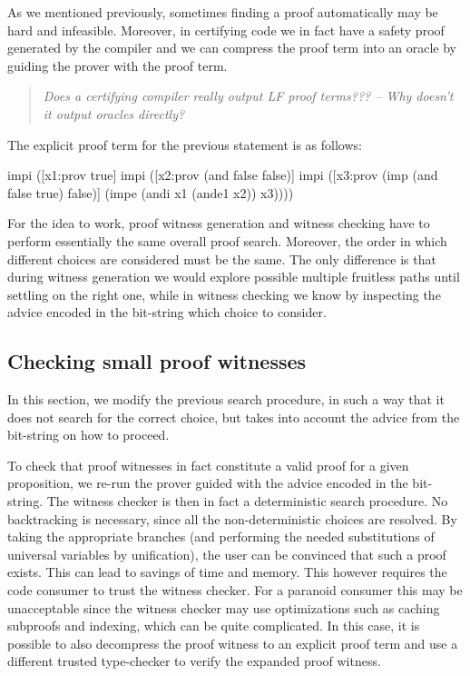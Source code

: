 \documentclass{acmconf}
\newenvironment{note}{\begin{quote}\message{note!}\it}{\end{quote}}
\begin{document}
As we mentioned previously, sometimes finding a proof automatically
may be hard and infeasible. Moreover, in certifying code we in fact
have a safety proof generated by the compiler and we can compress the
proof term into an oracle by guiding the prover with the proof term.

\begin{note}
  Does a certifying compiler really output LF proof terms??? -- Why
  doesn't it output oracles directly?
\end{note}

The explicit proof term for the previous statement is as follows:
 
\begin{code}
impi ([x1:prov true] 
    impi ([x2:prov (and false false)]
           impi 
               ([x3:prov (imp (and false true) 
                    false)]
               (impe (andi x1 (ande1 x2)) 
                    x3))))
\end{code}

For the idea to work, proof witness generation and witness checking
have to perform essentially the same overall proof search. Moreover,
the order in which different choices are considered must be the same.
The only difference is that during witness generation we would explore
possible multiple fruitless paths until settling on the right one,
while in witness checking we know by inspecting the advice encoded in
the bit-string which choice to consider.

\subsection{Checking small proof witnesses}
In this section, we modify the previous search procedure, in such a
way that it does not search for the correct choice, but takes into
account the advice from the bit-string on how to proceed. 

To check that proof witnesses in fact constitute a valid proof for a
given proposition, we re-run the prover guided with the advice encoded
in the bit-string. The witness checker is then in fact a deterministic
search procedure. No backtracking is necessary, since all the
non-deterministic choices are resolved.  By taking the appropriate
branches (and performing the needed substitutions of universal
variables by unification), the user can be convinced that such a
proof exists. This can lead to savings of time and memory.
This however requires the code consumer to trust the witness
checker. For a paranoid consumer this may be unacceptable since the witness
checker may use optimizations such as caching subproofs and indexing,
which can be quite complicated. In this case, it is possible to also
decompress the proof witness to an explicit proof term and use a different
trusted type-checker to verify the expanded proof witness.
\end{document}
